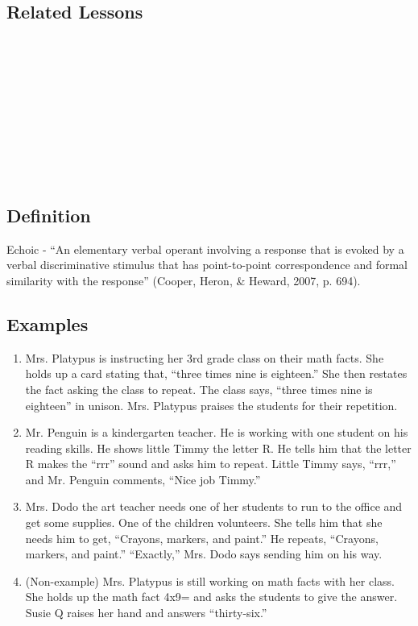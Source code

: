 \subsection{Related Lessons}
\fourdTen{}\\
\fourdEleven{}\\
\fourdTwelve{}\\
\fourdThirteen{}\\
\fourdFourteen{}\\
\fourFKFourtyThree{}\\
\fourFKFourtyFour{}\\
\fourFKFourtyFive{}\\
\fourFKFourtySix{}\\
%
\subsection{Definition}  
Echoic - ``An elementary verbal operant involving a response that is evoked by a verbal discriminative stimulus that has point-to-point correspondence and formal similarity with the response'' (Cooper, Heron, \& Heward, 2007, p. 694).   
%
\subsection{Examples}
\begin{enumerate}
\item Mrs. Platypus is instructing her 3rd grade class on their math facts.  She holds up a card stating that, ``three times nine is eighteen.''  She then restates the fact asking the class to repeat.  The class says, ``three times nine is eighteen'' in unison.  Mrs. Platypus praises the students for their repetition.
\item Mr. Penguin is a kindergarten teacher.  He is working with one student on his reading skills.  He shows little Timmy the letter R.  He tells him that the letter R makes the ``rrr'' sound and asks him to repeat.  Little Timmy says, ``rrr,'' and Mr. Penguin comments, ``Nice job Timmy.''  
\item Mrs. Dodo the art teacher needs one of her students to run to the office and get some supplies. One of the children volunteers.  She tells him that she needs him to get, ``Crayons, markers, and paint.''  He repeats, ``Crayons, markers, and paint.''  ``Exactly,'' Mrs. Dodo says sending him on his way.  
\item (Non-example) Mrs. Platypus is still working on math facts with her class.  She holds up the math fact 4x9= and asks the students to give the answer.  Susie Q raises her hand and answers ``thirty-six.''  
%
\end{enumerate}
%
